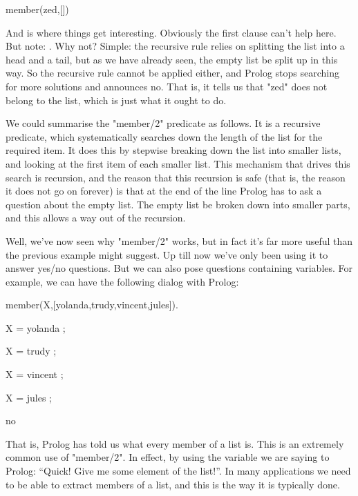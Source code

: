 \begin{LPNcodedisplay}
member(zed,[])
\end{LPNcodedisplay}
And  is where things get interesting.  Obviously the
first clause can't help here.  But note: .  Why not? Simple: the recursive rule
relies on splitting the list into a head and a tail, but as we have
already seen, the empty list  be split up in this way.
So the recursive rule cannot be applied either, and Prolog stops
searching for more solutions and announces no.  That is, it tells us
that "zed" does not belong to the list, which is just what it ought to
do.

We could summarise the "member/2" predicate as follows.  It
is a recursive predicate, which systematically searches down the
length of the list for the required item.  It does this by stepwise
breaking down the list into smaller lists, and looking at the first
item of each smaller list.  This mechanism that drives this
search is recursion, and the reason that this recursion is safe (that
is, the reason it does not go on forever) is that at the end of the
line Prolog has to ask a question about the empty list.  The empty
list  be broken down into smaller parts, and this allows a
way out of the recursion.

Well, we've now seen why "member/2" works, but in fact it's
far more useful than the previous example might suggest.  Up till now
we've only been using it to answer yes/no questions.  But we can also
pose questions containing variables.  For example, we can have the
following dialog with Prolog:


\begin{LPNcodedisplay}
member(X,[yolanda,trudy,vincent,jules]).

X = yolanda ;

X = trudy ;

X = vincent ;

X = jules ;

no
\end{LPNcodedisplay}


That is, Prolog has told us what every member of a list is.  This is
an extremely common use of "member/2". In effect, by using the
variable we are saying to Prolog: ``Quick! Give me some element of the
list!''. In many applications we need to be able to extract members of
a list, and this is the way it is typically done.



